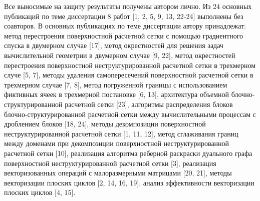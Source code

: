 Все выносимые на защиту результаты получены автором лично.
Из 24 основных публикаций по теме диссертации 8 работ [1, 2, 5, 9, 13, 22-24] выполнены без соавторов.
В основных публикациях по теме диссертации автору принадлежат: метод перестроения поверхностной расчетной сетки с помощью градиентного спуска в двумерном случае [17], метод окрестностей для решения задач вычислительной геометрии в двумерном случае [9, 22], метод окрестностей перестроения поверхностной неструктурированной расчетной сетки в трехмерном случе [5, 7], методы удаления самопересечений поверхностной расчетной сетки в трехмерном случае [7, 8], метод погруженной границы с использованием фиктивных ячеек в трехмерной постановке [6, 13], архитектура объемной блочно-структурированной расчетной сетки [23], алгоритмы распределения блоков блочно-структурированной расчетной сетки между вычислительными процессам с дроблением блоков [18, 24], методы декомпозиции поверхностной неструктурированной расчетной сетки [1, 11, 12], метод сглаживания границ между доменами при декомпозиции поверхностной неструктурированной расчетной сетки [10], реализация алгоритма реберной раскраски дуального графа поверхностной неструктурированной расчетной сетки [3], реализация векторизованных операций с малоразмерными матрицами [20, 21], методы векторизации плоских циклов [2, 14, 16, 19], анализ эффективности векторизации плоских циклов [4, 15].
